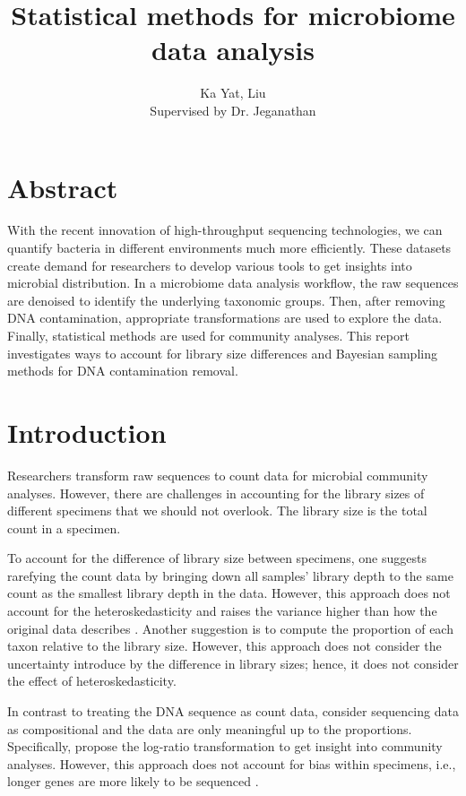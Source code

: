 \documentclass[12pt]{article}
\title{Statistical methods for microbiome data analysis}
\author{Ka Yat, Liu \\ Supervised by Dr. Jeganathan}
\date{}
\begin{document}
\maketitle
\section*{Abstract}
With the recent innovation of high-throughput sequencing technologies, we can quantify bacteria in different environments much more efficiently. These datasets create demand for researchers to develop various tools to get insights into microbial distribution. In a microbiome data analysis workflow, the raw sequences are denoised to identify the underlying taxonomic groups. Then, after removing DNA contamination, appropriate transformations are used to explore the data. Finally, statistical methods are used for community analyses. This report investigates ways to account for library size differences and Bayesian sampling methods for DNA contamination removal. 

\section{Introduction}
Researchers transform raw sequences to count data for microbial community analyses. However, there are challenges in accounting for the library sizes of different specimens that we should not overlook. The library size is the total count in a specimen.

To account for the difference of library size between specimens, one suggests rarefying the count data by bringing down all samples’ library depth to the same count as the smallest library depth in the data. However, this approach does not account for the heteroskedasticity and raises the variance higher than how the original data describes \citep{mcmurdie2014waste}. Another suggestion is to compute the proportion of each taxon relative to the library size. However, this approach does not consider the uncertainty introduce by the difference in library sizes; hence, it does not consider the effect of heteroskedasticity.

In contrast to treating the DNA sequence as count data, \cite{quinn2018understanding} consider sequencing data as compositional and the data are only meaningful up to the proportions. Specifically, \cite{quinn2018understanding} propose the log-ratio transformation to get insight into community analyses. However, this approach does not account for bias within specimens, i.e., longer genes are more likely to be sequenced \citep{soneson2013comparison}.  
\end{document}
